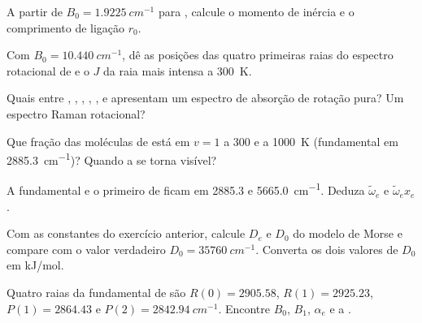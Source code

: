 \begin{exercise}[$\star$]\label{exo:b3:rovibrational-spectroscopy:1}
A partir de $B_0 = \qty{1.9225}{cm^{-1}}$ para , calcule o momento de
inércia e o comprimento de ligação $r_0$.
\end{exercise}

\begin{exercise}[$\star$]\label{exo:b3:rovibrational-spectroscopy:2}
Com $B_0 = \qty{10.440}{cm^{-1}}$, dê as posições das quatro primeiras raias do
espectro rotacional de  e o $J$ da raia mais intensa a
\qty{300}{K}.
\end{exercise}

\begin{exercise}[$\star$]\label{exo:b3:rovibrational-spectroscopy:3}
Quais entre , , , , ,  e  apresentam um
espectro de absorção de rotação pura? Um espectro Raman rotacional?
\end{exercise}

\begin{exercise}[$\star$]\label{exo:b3:rovibrational-spectroscopy:4}
Que fração das moléculas de  está em $v = 1$ a 300 e a \qty{1000}{K}
(fundamental em \qty{2885.3}{cm^{-1}})? Quando a  se torna visível?
\end{exercise}

\begin{exercise}[$\star\star$]\label{exo:b3:rovibrational-spectroscopy:5}
A fundamental e o primeiro  de  ficam em 2885.3 e
\qty{5665.0}{cm^{-1}}. Deduza $\tilde\omega_e$ e $\tilde\omega_ex_e$.
\end{exercise}

\begin{exercise}[$\star\star$]\label{exo:b3:rovibrational-spectroscopy:6}
Com as constantes do exercício anterior, calcule $D_e$ e $D_0$ do modelo de
Morse e compare com o valor verdadeiro $D_0 = \qty{35760}{cm^{-1}}$. Converta os dois
valores de $D_0$ em \unit{kJ/mol}.
\end{exercise}

\begin{exercise}[$\star\star$]\label{exo:b3:rovibrational-spectroscopy:7}
Quatro raias da fundamental de  são $R(0) = 2905.58$, $R(1) = 2925.23$,
$P(1) = 2864.43$ e $P(2) = \qty{2842.94}{cm^{-1}}$. Encontre $B_0$, $B_1$, $\alpha_e$ e
a .
\end{exercise}

